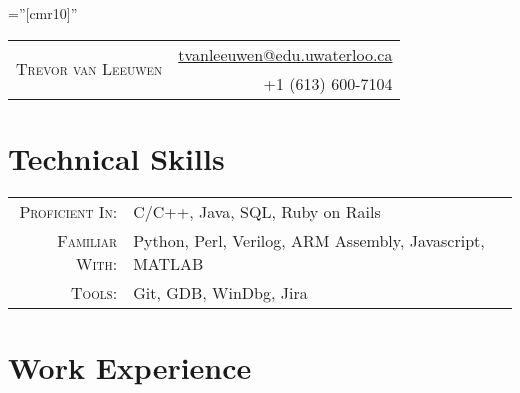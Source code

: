 \documentclass[a4paper,10pt]{article}
\begin{document}
\pagestyle{empty} %

\font\fb=''[cmr10]'' %

\par{
    \begin{tabular}{lr}

        \multirow{2}{12.9cm}{\Huge{\textsc{Trevor van Leeuwen}}} & \href{mailto:tvanleeuwen@edu.uwaterloo.ca}{tvanleeuwen@edu.uwaterloo.ca} \\
         & +1 (613) 600-7104
    \end{tabular}
\bigskip\par}

\section{Technical Skills}

\begin{tabular}{rl}
    \textsc{Proficient In:} & C/C++, Java, SQL, Ruby on Rails \\
    \textsc{Familiar With:} & Python, Perl, Verilog, ARM Assembly, Javascript, MATLAB \\
   	\textsc{Tools:} & Git, GDB, WinDbg, Jira \\
\end{tabular}

\section{Work Experience}


\end{document}
